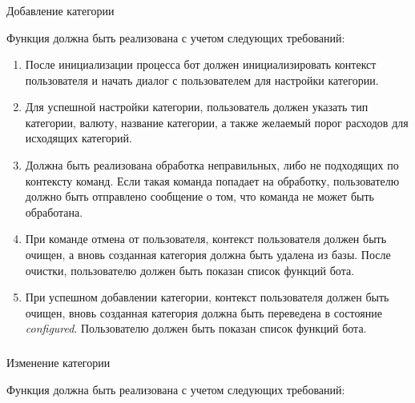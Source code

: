 \vskip 0.9in
\subsubsection{} Добавление категории
\label{sec:domain:specification:addcategory}

Функция должна быть реализована с учетом следующих требований:

\begin{enumerate}
	\item После инициализации процесса бот должен инициализировать контекст пользователя и начать диалог с пользователем для настройки категории.
	\item Для успешной настройки категории, пользователь должен указать тип категории, валюту, название категории, а также желаемый порог расходов для исходящих категорий.
	\item Должна быть реализована обработка неправильных, либо не подходящих по контексту команд. Если такая команда попадает на обработку, пользователю должно быть отправлено сообщение о том, что команда не может быть обработана.
	\item При команде отмена от пользователя, контекст пользователя должен быть очищен, а вновь созданная категория должна быть удалена из базы. После очистки, пользователю должен быть показан список функций бота.
	\item При успешном добавлении категории, контекст пользователя должен быть очищен, вновь созданная категория должна быть переведена в состояние \emph{configured}. Пользователю должен быть показан список функций бота.
\end{enumerate}

\subsubsection{} Изменение категории
\label{sec:domain:specification:editcategory}

Функция должна быть реализована с учетом следующих требований:

